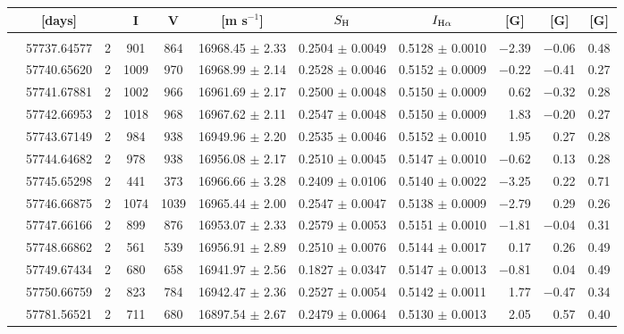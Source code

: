\documentclass[a4paper,fleqn,usenatbib]{mnras}
\begin{document}
\begin{table*}
\begin{threeparttable}
{\begin{tabular}{c c c c c c c c r r c}
& [days] & & I & V & [m s$^{-1}$] & $S_{\rm H}$ & $I_{\rm H\alpha}$ & \multicolumn{1}{c}{[G]} & \multicolumn{1}{c}{[G]} & [G] \\[3pt]
\hline
& & & & & & & &\\[-3pt]                    
\parbox[t]{1mm}{} & 57737.64577  & 2 & 901 & 864 & 16968.45 $\pm$ 2.33  &   0.2504 $\pm$ 0.0049  &   0.5128 $\pm$ 0.0010  &$-$2.39  & $-$0.06 & 0.48\\   
 & 57740.65620  & 2 & 1009  & 970 & 16968.99 $\pm$ 2.14  &   0.2528 $\pm$ 0.0046  &   0.5152 $\pm$ 0.0009  & $-$0.22 &   $-$0.41    &  0.27\\   
 & 57741.67881  & 2 & 1002  & 966 & 16961.69 $\pm$ 2.17  &   0.2500 $\pm$ 0.0048  &   0.5150 $\pm$ 0.0009  &       0.62 &  $-$0.32    &  0.28\\  
 & 57742.66953  & 2 & 1018  & 968 & 16967.62 $\pm$ 2.11  &   0.2547 $\pm$ 0.0048  &   0.5150 $\pm$ 0.0009  &       1.83 &  $-$0.20     & 0.27 \\  
 & 57743.67149  & 2 &  984  &  938 &16949.96 $\pm$ 2.20  &   0.2535 $\pm$ 0.0046  &   0.5152 $\pm$ 0.0010  &        1.95 &   0.27         & 0.28 \\  
 & 57744.64682  & 2 &  978  &  938 &16956.08 $\pm$ 2.17  &   0.2510 $\pm$ 0.0045  &   0.5147 $\pm$ 0.0010  &  $-$0.62  &   0.13         & 0.28 \\   
 & 57745.65298  & 2 &  441  &  373 &16966.66 $\pm$ 3.28  &   0.2409 $\pm$ 0.0106  &   0.5140 $\pm$ 0.0022  &  $-$3.25 &    0.22         & 0.71 \\  
 & 57746.66875  & 2 & 1074 & 1039 & 16965.44 $\pm$ 2.00  &   0.2547 $\pm$ 0.0047  &   0.5138 $\pm$ 0.0009 & $-$2.79  &    0.29         & 0.26 \\  
 & 57747.66166  & 2 &  899  &  876 &16953.07 $\pm$ 2.33  &   0.2579 $\pm$ 0.0053  &   0.5151 $\pm$ 0.0010  &  $-$1.81 &   $-$0.04     & 0.31 \\  
 & 57748.66862  & 2 &  561  &  539 &16956.91 $\pm$ 2.89  &   0.2510 $\pm$ 0.0076  &   0.5144 $\pm$ 0.0017  &        0.17 &   0.26         & 0.49 \\  
 & 57749.67434  & 2 &  680  &  658 &16941.97 $\pm$ 2.56  &   0.1827 $\pm$ 0.0347  &   0.5147 $\pm$ 0.0013  &  $-$0.81 &    0.04         & 0.49 \\   
 & 57750.66759  & 2 &  823  &  784 &16942.47 $\pm$ 2.36  &   0.2527 $\pm$ 0.0054  &   0.5142 $\pm$ 0.0011  &        1.77 &  $-$0.47     & 0.34 \\[3pt]  
\parbox[t]{1mm}{} & 57781.56521  & 2 & 711 & 680 & 16897.54 $\pm$ 2.67  &   0.2479 $\pm$ 0.0064  &   0.5130 $\pm$ 0.0013  &  2.05  & 0.57 & 0.40\\  

\end{tabular}}
\end{threeparttable}
\end{table*}
\end{document}
